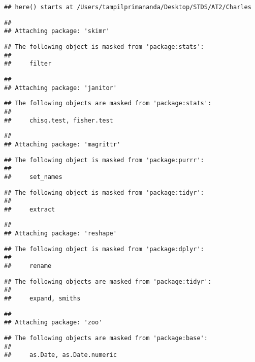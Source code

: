 \documentclass[]{article}
\begin{document}
\begin{verbatim}
## here() starts at /Users/tampilprimananda/Desktop/STDS/AT2/Charles
\end{verbatim}

\begin{verbatim}
## 
## Attaching package: 'skimr'
\end{verbatim}

\begin{verbatim}
## The following object is masked from 'package:stats':
## 
##     filter
\end{verbatim}

\begin{verbatim}
## 
## Attaching package: 'janitor'
\end{verbatim}

\begin{verbatim}
## The following objects are masked from 'package:stats':
## 
##     chisq.test, fisher.test
\end{verbatim}

\begin{verbatim}
## 
## Attaching package: 'magrittr'
\end{verbatim}

\begin{verbatim}
## The following object is masked from 'package:purrr':
## 
##     set_names
\end{verbatim}

\begin{verbatim}
## The following object is masked from 'package:tidyr':
## 
##     extract
\end{verbatim}

\begin{verbatim}
## 
## Attaching package: 'reshape'
\end{verbatim}

\begin{verbatim}
## The following object is masked from 'package:dplyr':
## 
##     rename
\end{verbatim}

\begin{verbatim}
## The following objects are masked from 'package:tidyr':
## 
##     expand, smiths
\end{verbatim}

\begin{verbatim}
## 
## Attaching package: 'zoo'
\end{verbatim}

\begin{verbatim}
## The following objects are masked from 'package:base':
## 
##     as.Date, as.Date.numeric
\end{verbatim}
\end{document}
